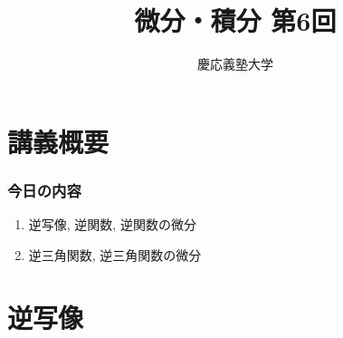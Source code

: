 \documentclass[dvipdfmx,cjk,10.2pt]{beamer}
\theoremstyle{definition}
\begin{document}
\title{微分・積分 第6回} 
\author{慶応義塾大学}            %
\date{}



\begin{frame}                  %
\titlepage                     %
\end{frame}








\section{講義概要}


\begin{frame}
\frametitle{今日の内容}



\begin{enumerate}
\item 逆写像, 逆関数, 逆関数の微分
\item 逆三角関数, 逆三角関数の微分
\end{enumerate} 



\end{frame}









\section{逆写像}
\end{document}
